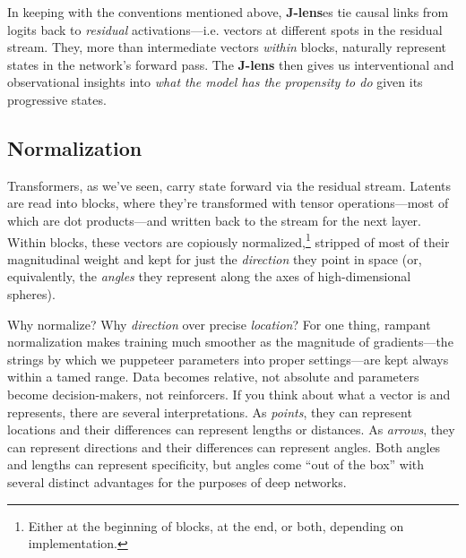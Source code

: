 \documentclass{article}
\begin{document}
In keeping with the conventions mentioned above, \textbf{J-lens}es tie causal links from logits back to \textit{residual} activations---i.e. vectors at different spots in the residual stream. They, more than intermediate vectors \textit{within} blocks, naturally represent states in the network's forward pass. The \textbf{J-lens} then gives us interventional and observational insights into \textit{what the model has the propensity to do} given its progressive states.


\subsection{Normalization}

Transformers, as we've seen, carry state forward via the residual stream. Latents are read into blocks, where they're transformed with tensor operations---most of which are dot products---and written back to the stream for the next layer. Within blocks, these vectors are copiously normalized,\footnote{Either at the beginning of blocks, at the end, or both, depending on implementation.} stripped of most of their magnitudinal weight and kept for just the \textit{direction} they point in space (or, equivalently, the \textit{angles} they represent along the axes of high-dimensional spheres). 

Why normalize? Why \textit{direction} over precise \textit{location}? For one thing, rampant normalization makes training much smoother as the magnitude of gradients---the strings by which we puppeteer parameters into proper settings---are kept always within a tamed range. Data becomes relative, not absolute and parameters become decision-makers, not reinforcers. If you think about what a vector is and represents, there are several interpretations. As \textit{points}, they can represent locations and their differences can represent lengths or distances. As \textit{arrows}, they can represent directions and their differences can represent angles. Both angles and lengths can represent specificity, but angles come ``out of the box'' with several distinct advantages for the purposes of deep networks. 

\end{document}
